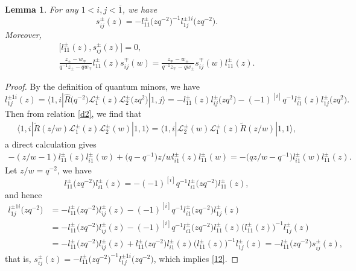 \documentclass[10pt,a4paper]{amsart}
\numberwithin{equation}{section}
\newtheorem{Lemma}[Theorem]{Lemma}
\begin{document}
\begin{Lemma}\label{le1}
For any $1<i,j <\overline{1}$, we have
\begin{equation}\label{12}
 s^{\pm}_{ij}(z)=- l_{11}^{\pm}\bigl(zq^{-2}\bigr)^{-1}l^{\pm 1i}_{1j}\bigl(zq^{-2}\bigr).
\end{equation}Moreover,
\begin{gather}\label{13}
 \bigl[l_{11}^{\pm}(z),s^{\pm}_{ij}(z)\bigr]=0, \\
 \label{14}
 \frac{z_{\pm}-w_{\mp}}{q^{-1}z_{\pm}-qw_{\mp}}l_{11}^{\pm}(z)s^{\mp}_{ij}(w)=\frac{z_{\mp}
 -w_{\pm}}{q^{-1}z_{\mp}-qw_{\pm}}s^{\mp}_{ij}(w)l_{11}^{\pm}(z).
\end{gather}
\end{Lemma}
\begin{proof}
By the definition of quantum minors, we have
\begin{equation*}
 l^{\pm 1i}_{1j}(z)=\big\langle 1, i|\widehat{R}\bigl(q^{-2}\bigr)\mathcal{L}_1^{\pm}(z)\mathcal{L}_2^{\pm}\bigl(zq^2\bigr)|1, j\big\rangle=-l_{11}^{\pm}(z)l_{ij}^{\pm}\bigl(zq^{2}\bigr)-(-1)^{[i]}q^{-1}l_{i1}^{\pm}(z)l_{1j}^{\pm}\bigl(zq^{2}\bigr).
\end{equation*}
Then from relation \eqref{d2}, we find that
\begin{gather*}
\big\langle 1, i|\widetilde{R}(z/w)\mathcal{L}_1^{\pm}(z)\mathcal{L}_2^{\pm}(w)|1, 1\big\rangle=\big\langle 1, i|\mathcal{L}_2^{\pm}(w)\mathcal{L}_1^{\pm}(z)\widetilde{R}(z/w)|1, 1\big\rangle,
\end{gather*}
a direct calculation gives
\begin{gather*}
 -(z/w-1)l_{11}^{\pm}(z)l_{i1}^{\pm}(w)+\bigl(q-q^{-1}\bigr)z/wl_{i1}^{\pm}(z)l_{11}^{\pm}(w)=-\bigl(qz/w-q^{-1}\bigr)l_{i1}^{\pm}(w)l_{11}^{\pm}(z).
\end{gather*}
Let $z/w=q^{-2}$, we have
\begin{equation*}
 l_{11}^{\pm}\bigl(zq^{-2}\bigr)l_{i1}^{\pm}(z)=-(-1)^{[i]}q^{-1}l_{i1}^{\pm}\bigl(zq^{-2}\bigr)l_{11}^{\pm}(z),
\end{equation*}
and hence
\begin{align*}
 l^{\pm 1i}_{1j}\bigl(zq^{-2}\bigr)&=-l_{11}^{\pm}\bigl(zq^{-2}\bigr)l_{ij}^{\pm}(z)-(-1)^{[i]}q^{-1}l_{i1}^{\pm}\bigl(zq^{-2}\bigr)l_{1j}^{\pm}(z) \\
 &=-l_{11}^{\pm}\bigl(zq^{-2}\bigr)l_{ij}^{\pm}(z)-(-1)^{[i]}q^{-1}l_{i1}^{\pm}\bigl(zq^{-2}\bigr)l_{11}^{\pm}(z)\bigl(l_{11}^{\pm}(z)\bigr)^{-1}l_{1j}^{\pm}(z)\\
 &=-l_{11}^{\pm}\bigl(zq^{-2}\bigr)l_{ij}^{\pm}(z)+l_{11}^{\pm}\bigl(zq^{-2}\bigr)l_{i1}^{\pm}(z)\bigl(l_{11}^{\pm}(z)\bigr)^{-1}l_{1j}^{\pm}(z)=-l_{11}^{\pm}\bigl(zq^{-2}\bigr)s^{\pm}_{ij}(z),
\end{align*}
that is, $s^{\pm}_{ij}(z)=- l_{11}^{\pm}\bigl(zq^{-2}\bigr)^{-1}l^{\pm 1i}_{1j}\bigl(zq^{-2}\bigr)$,
which implies \eqref{12}.


\end{proof}
\end{document}
